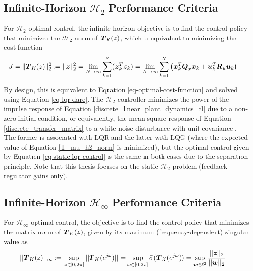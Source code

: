 \subsection{Infinite-Horizon $\mathcal{H}_{2}$ Performance Criteria}
For $\mathcal{H}_{2}$ optimal control, the infinite-horizon objective is to find the control policy that minimizes the $\mathcal{H}_{2}$ norm of $\vb*{T}_{K}(z)$, which is equivalent to minimizing the cost function
\begin{equation}
\begin{aligned}
	J &= \lVert \vb*{T}_{K}(z) \rVert_{2}^{2} := \lVert \vb*{z} \rVert_{2}^{2} = \lim_{N \to \infty} \sum_{k = 1}^{N} (\vb*{z}_{k}^{T}\vb*{z}_{k})
	= \lim_{N \to \infty} \sum_{k = 1}^{N} \big{(} \vb*{x}_{k}^{T} \vb*{Q}_{x} \vb*{x}_{k} + \vb*{u}_{k}^{T} \vb*{R}_{u} \vb*{u}_{k} \big{)}
\end{aligned} \label{T_mu_h2_norm}
\end{equation}

By design, this is equivalent to Equation \eqref{eq-optimal-cost-function} and solved using Equation \eqref{eq-lqr-dare}.  The $\mathcal{H}_{2}$ controller minimizes the power of the impulse response of Equation \eqref{discrete_linear_plant_dynamics_cl} due to a non-zero initial condition, or equivalently, the mean-square response of Equation \eqref{discrete_transfer_matrix} to a white noise disturbance with unit covariance \cite{van2020data}.  The former is associated with LQR and the latter with LQG (where the expected value of Equation \eqref{T_mu_h2_norm} is minimized), but the optimal control given by Equation \eqref{eq-static-lqr-control} is the same in both cases due to the separation principle.  Note that this thesis focuses on the static $\mathcal{H}_{2}$ problem (feedback regulator gains only).

\subsection{Infinite-Horizon $\mathcal{H}_{\infty}$ Performance Criteria}
For $\mathcal{H}_{\infty}$ optimal control, the objective is to find the control policy that minimizes the matrix norm of $\vb*{T}_{K}(z)$, given by its maximum (frequency-dependent) singular value as
\begin{equation}
\begin{aligned}
	||\vb*{T}_{K}(z)||_{\infty} &:= \sup_{\omega \in \left[0, 2 \pi \right]} ||\vb*{T}_{K}(e^{j\omega})||
	= \sup_{\omega \in \left[0, 2 \pi \right]} \bar{\sigma}(\vb*{T}_{K}(e^{j\omega}))
	= \sup_{\vb*{w} \in \ell^{2}} \frac{||\vb*{z}||_{2}}{||\vb*{w}||_{2}}
\end{aligned} \label{hinf_norm_cost}
\end{equation}

